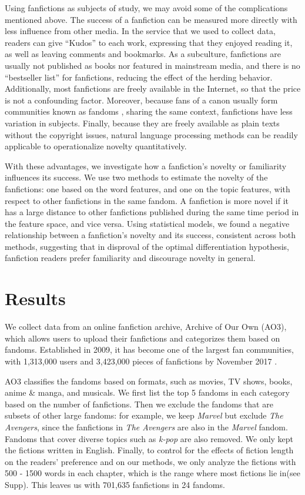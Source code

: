 \documentclass[a4paper]{article}
\begin{document}
Using fanfictions as subjects of study, we may avoid some of the complications mentioned above. The success of a fanfiction can be measured more directly with less influence from other media. In the service that we used to collect data, readers can give ``Kudos'' to each work, expressing that they enjoyed reading it, as well as leaving comments and bookmarks. As a subculture, fanfictions are usually not published as books nor featured in mainstream media, and there is no ``bestseller list'' for fanfictions, reducing the effect of the herding behavior. Additionally, most fanfictions are freely available in the Internet, so that the price is not a confounding factor. Moreover, because fans of a canon usually form communities known as fandoms \cite{wiki:fandom}, sharing the same context, fanfictions have less variation in subjects. Finally, because they are freely available as plain texts without the copyright issues, natural language processing methods can be readily applicable to operationalize novelty quantitatively.

With these advantages, we investigate how a fanfiction's novelty or familiarity influences its success. We use two methods to estimate the novelty of the fanfictions: one based on the word features, and one on the topic features, with respect to other fanfictions in the same fandom. A fanfiction is more novel if it has a large distance to other fanfictions published during the same time period in the feature space, and vice versa. Using statistical models, we found a negative relationship between a fanfiction's novelty and its success, consistent across both methods, suggesting that in disproval of the optimal differentiation hypothesis, fanfiction readers prefer familiarity and discourage novelty in general.


\section*{Results} 
We collect data from an online fanfiction archive, Archive of Our Own (AO3), which allows users to upload their fanfictions and categorizes them based on fandoms. Established in 2009, it has become one of the largest fan communities, with 1,313,000 users and 3,423,000 pieces of fanfictions by November 2017 \cite{ao3stats}.

AO3 classifies the fandoms based on formats, such as movies, TV shows, books, anime \& manga, and musicals. We first list the top 5 fandoms in each category based on the number of fanfictions. Then we exclude the fandoms that are subsets of other large fandoms: for example, we keep \emph{Marvel} but exclude \emph{The Avengers}, since the fanfictions in \emph{The Avengers} are also in the \emph{Marvel} fandom. Fandoms that cover diverse topics such as \emph{k-pop} are also removed. We only kept the fictions written in English. Finally, to control for the effects of fiction length on the readers' preference and on our methods, we only analyze the fictions with 500 - 1500 words in each chapter, which is the range where most fictions lie in(see Supp). This leaves us with 701,635 fanfictions in 24 fandoms.
\end{document}
